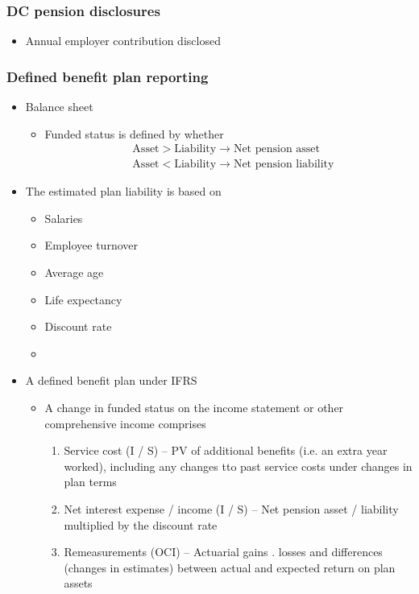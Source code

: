 \documentclass[../notes_compiled.tex]{subfiles}
\begin{document}
\subsubsection{DC pension disclosures}
\begin{itemize}
\item Annual employer contribution disclosed
\end{itemize}

\subsubsection{Defined benefit plan reporting}
\begin{itemize}
\item Balance sheet
\begin{itemize}
\item Funded status is defined by whether
\begin{align*}
&\text{Asset} > \text{Liability} \longrightarrow \text{Net pension asset} \\
&\text{Asset} < \text{Liability} \longrightarrow \text{Net pension liability}
\end{align*}
\end{itemize}
\item The estimated plan liability is based on
\begin{multicols}{2}
\begin{itemize}
\item Salaries
\item Employee turnover
\item Average age
\item Life expectancy
\item Discount rate
 \item[]
\end{itemize}
\end{multicols}
\item A defined benefit plan under IFRS
\begin{itemize}
\item A change in funded status on the income statement or other comprehensive income comprises
\begin{enumerate}
\item Service cost (I / S) -- PV of additional benefits (i.e. an extra year worked), including any changes tto past service costs under changes in plan terms
\item Net interest expense / income (I / S) -- Net pension asset / liability multiplied by the discount rate
\item Remeasurements (OCI) -- Actuarial gains . losses and differences (changes in estimates) between actual and expected return on plan assets
\end{enumerate}
\end{itemize}


\end{itemize}
\end{document}
